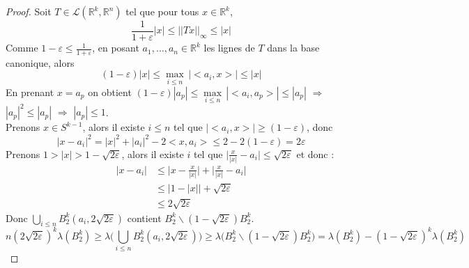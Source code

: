\documentclass[12pt]{article}
\theoremstyle{definition}
\begin{document}
\begin{proof}
	Soit $T\in \mathcal{L}(\mathbb{R}^k,\mathbb{R}^n)$ tel que pour tous $x\in\mathbb{R}^k$,
	\begin{equation*}
		\frac{1}{1+\varepsilon}|x|\leq ||T x||_\infty \leq |x|
	\end{equation*}
	Comme $1-\varepsilon\leq \frac{1}{1+\varepsilon}$, en posant $a_1,\dots,a_n\in\mathbb{R}^k$ les lignes de $T$ dans la base canonique, alors 
	\begin{equation*}
		(1-\varepsilon)|x|\leq \underset{i\leq n}{\max}\,|<a_i,x>|\leq |x|
	\end{equation*}
	En prenant $x=a_p$ on obtient $(1-\varepsilon)|a_p|\leq\underset{i\leq n}{\max}\,|<a_i,a_p>|  \leq |a_p| $ $\Rightarrow$ $|a_p|^2\leq|a_p|$ $\Rightarrow$ $|a_p|\leq 1$.\\
	Prenons $x\in S^{k-1}$, alors il existe $i\leq n$ tel que $|<a_i,x>|\geq (1-\varepsilon)$, donc 
	\begin{equation*}
		|x-a_i|^2=|x|^2+|a_i|^2-2<x,a_i>\leq 2-2(1-\varepsilon)=2\varepsilon
	\end{equation*}
	Prenons $1>|x|>1-\sqrt{2\varepsilon}$, alors il existe $i$ tel que $\big|\frac{x}{|x|}-a_i\big|\leq \sqrt{2\varepsilon}$ et donc :
	\begin{align*}
		|x-a_i|&\leq \big|x-\frac{x}{|x|}\big|+\big|\frac{x}{|x|}-a_i\big|\\
		&\leq \big|1-|x|\big|+\sqrt{2\varepsilon}\\
		&\leq 2\sqrt{2\varepsilon}
	\end{align*}
	Donc $\bigcup_{i\leq n}B^k_2(a_i,2\sqrt{2\varepsilon})$ contient $B^k_2\backslash (1-\sqrt{2\varepsilon})B^k_2$.
	\begin{equation*}
		n(2\sqrt{2\varepsilon})^k\lambda(B^k_2) \geq	\lambda\big(\bigcup_{i\leq n}B^k_2(a_i,2\sqrt{2\varepsilon})\big)\geq \lambda\big(B^k_2\backslash (1-\sqrt{2\varepsilon})B^k_2\big) =\lambda(B^k_2)-(1-\sqrt{2\varepsilon})^k\lambda(B^k_2)
	\end{equation*}


\end{proof}
\end{document}

